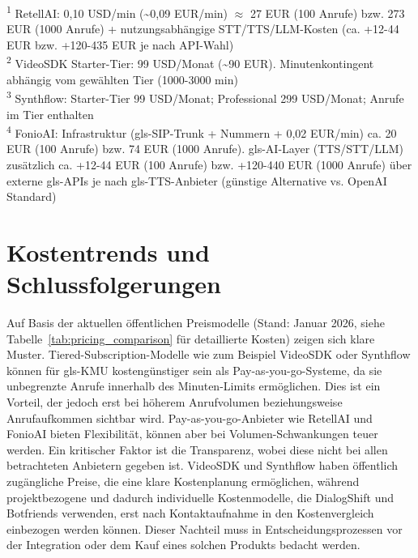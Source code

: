 \begin{table}[H]
\begin{flushleft}
\textsuperscript{1} RetellAI: 0,10 USD/min (\textasciitilde 0,09 EUR/min) $\approx$ 27 EUR (100 Anrufe) bzw. 273 EUR (1000 Anrufe) + nutzungsabhängige STT/TTS/LLM-Kosten (ca. +12-44 EUR bzw. +120-435 EUR je nach API-Wahl) \\
\textsuperscript{2} VideoSDK Starter-Tier: 99 USD/Monat (\textasciitilde 90 EUR). Minutenkontingent abhängig vom gewählten Tier (1000-3000 min) \\
\textsuperscript{3} Synthflow: Starter-Tier 99 USD/Monat; Professional 299 USD/Monat; Anrufe im Tier enthalten \\
\textsuperscript{4} FonioAI: Infrastruktur (\gls{gls-SIP}-Trunk + Nummern + 0,02 EUR/min) ca. 20 EUR (100 Anrufe) bzw. 74 EUR (1000 Anrufe). \gls{gls-AI}-Layer (TTS/STT/LLM) zusätzlich ca. +12-44 EUR (100 Anrufe) bzw. +120-440 EUR (1000 Anrufe) über externe \gls{gls-API}s je nach \gls{gls-TTS}-Anbieter (günstige Alternative vs. OpenAI Standard)
\end{flushleft}
\end{table}

\section{Kostentrends und Schlussfolgerungen}
Auf Basis der aktuellen öffentlichen Preismodelle (Stand: Januar 2026, siehe Tabelle~\ref{tab:pricing_comparison} für detaillierte Kosten) zeigen sich klare Muster. Tiered-Subscription-Modelle wie zum Beispiel VideoSDK oder Synthflow können für \gls{gls-KMU} kostengünstiger sein als Pay-as-you-go-Systeme, da sie unbegrenzte Anrufe innerhalb des Minuten-Limits ermöglichen. Dies ist ein Vorteil, der jedoch erst bei höherem Anrufvolumen beziehungsweise Anrufaufkommen sichtbar wird. Pay-as-you-go-Anbieter wie RetellAI und FonioAI bieten Flexibilität, können aber bei Volumen-Schwankungen teuer werden. Ein kritischer Faktor ist die Transparenz, wobei diese nicht bei allen betrachteten Anbietern gegeben ist. VideoSDK und Synthflow haben öffentlich zugängliche Preise, die eine klare Kostenplanung ermöglichen, während projektbezogene und dadurch individuelle Kostenmodelle, die DialogShift und Botfriends verwenden, erst nach Kontaktaufnahme in den Kostenvergleich einbezogen werden können. Dieser Nachteil muss in Entscheidungsprozessen vor der Integration oder dem Kauf eines solchen Produkts bedacht werden.

